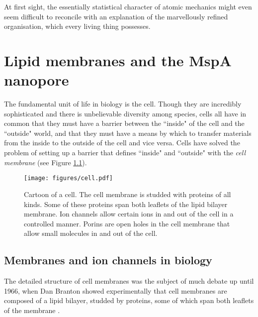 \begin{savequote}[75mm]
At first sight, the essentially statistical character of atomic mechanics might even seem difficult to reconcile with an explanation of the marvellously refined organisation, which every living thing possesses.
\end{savequote}

\chapter{Lipid membranes and the MspA nanopore}
\label{lipids_mspa}

The fundamental unit of life in biology is the cell.  Though they are incredibly sophisticated and there is unbelievable diversity among species, cells all have in common that they must have a barrier between the ``inside" of the cell and the ``outside" world, and that they must have a means by which to transfer materials from the inside to the outside of the cell and vice versa.  Cells have solved the problem of setting up a barrier that defines ``inside" and ``outside" with the \textit{cell membrane} (see Figure \ref{fig:ion_channels}).

\begin{figure}[h]
\begin{centering}
\texttt{[image: figures/cell.pdf]}
\caption[Ion channels in cells]{Cartoon of a cell.  The cell membrane is studded with proteins of all kinds.  Some of these proteins span both leaflets of the lipid bilayer membrane.  Ion channels allow certain ions in and out of the cell in a controlled manner.  Porins are open holes in the cell membrane that allow small molecules in and out of the cell.}
\label{fig:ion_channels}
\end{centering}
\end{figure}

\section{Membranes and ion channels in biology}

The detailed structure of cell membranes was the subject of much debate up until 1966, when Dan Branton showed experimentally that cell membranes are composed of a lipid bilayer, studded by proteins, some of which span both leaflets of the membrane \citep{Branton1966,Branton2016}.

